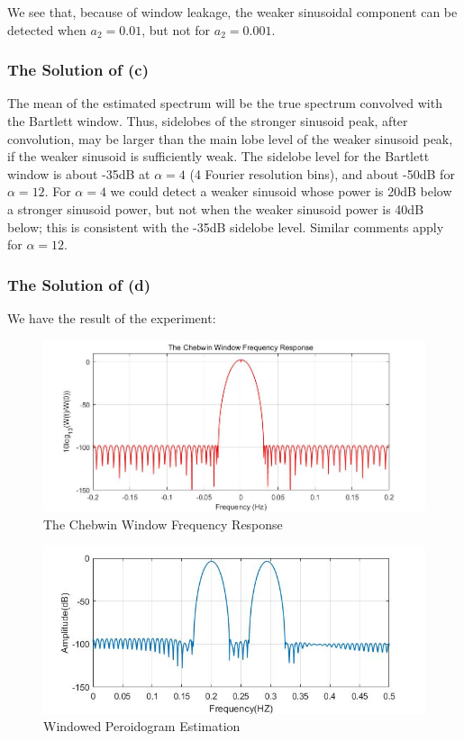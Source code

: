 \documentclass[UTF-8, a4paper, 12pt]{ctexart}
\begin{document}
We see that, because of window leakage, the weaker sinusoidal component can be detected when $a_2 = 0.01$, but not for $a_2 = 0.001$.
\subsubsection{The Solution of (c)}

The mean of the estimated spectrum will be the true spectrum convolved with the Bartlett window. Thus, sidelobes of the stronger sinusoid peak, after convolution, may be larger than the main lobe level of the weaker sinusoid peak, if the weaker sinusoid is sufficiently weak. The sidelobe level for the Bartlett window is about -35dB at $\alpha= 4$ (4 Fourier resolution bins), and about -50dB for $\alpha = 12$. For $\alpha = 4 $ we could detect a weaker sinusoid whose power is 20dB below a stronger sinusoid power, but not when the weaker sinusoid power is 40dB below; this is consistent with the -35dB sidelobe level. Similar comments apply for $\alpha = 12$.
\subsubsection{The Solution of (d)}
We have the result of the experiment:
\begin{figure}[htbp]
    \centering
    \includegraphics[width=12cm]{2/window.jpg}
    \caption{The Chebwin Window Frequency Response}
\end{figure}
\begin{figure}[htbp]
    \centering
    \includegraphics[width=12cm]{2/windowed.jpg}
    \caption{Windowed Peroidogram Estimation}
\end{figure}
\end{document}
